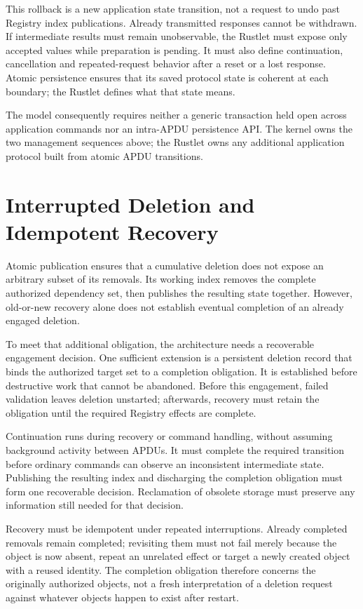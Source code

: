 This rollback is a new application state transition, not a request to undo
past Registry index publications. Already transmitted responses cannot be
withdrawn. If intermediate results must remain unobservable, the Rustlet must
expose only accepted values while preparation is pending. It must also define
continuation, cancellation and repeated-request behavior after a reset or a
lost response. Atomic persistence ensures that its saved protocol state is
coherent at each boundary; the Rustlet defines what that state means.

The model consequently requires neither a generic transaction held open
across application commands nor an intra-APDU persistence API. The kernel owns
the two management sequences above; the Rustlet owns any additional
application protocol built from atomic APDU transitions.

\section{Interrupted Deletion and Idempotent Recovery}
\label{sec:registry-deletion-recovery}

Atomic publication ensures that a cumulative deletion does not expose an
arbitrary subset of its removals. Its working index removes the complete
authorized dependency set, then publishes the resulting state together.
However, old-or-new recovery alone does not establish eventual completion of
an already engaged deletion.

To meet that additional obligation, the architecture needs a recoverable
engagement decision. One sufficient extension is a persistent deletion record
that binds the authorized target set to a completion obligation. It is
established before destructive work that cannot be abandoned. Before this
engagement, failed validation leaves deletion unstarted; afterwards, recovery
must retain the obligation until the required Registry effects are complete.

Continuation runs during recovery or command handling, without assuming
background activity between APDUs. It must complete the required transition
before ordinary commands can observe an inconsistent intermediate state.
Publishing the resulting index and discharging the completion obligation
must form one recoverable decision. Reclamation of obsolete storage must
preserve any information still needed for that decision.

Recovery must be idempotent under repeated interruptions. Already completed
removals remain completed; revisiting them must not fail merely because the
object is now absent, repeat an unrelated effect or target a newly created
object with a reused identity. The completion obligation therefore concerns
the originally authorized objects, not a fresh interpretation of a deletion
request against whatever objects happen to exist after restart.

